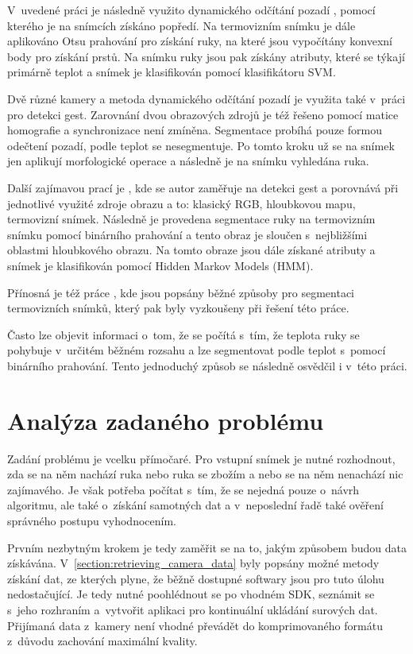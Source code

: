     V~uvedené práci je následně využito dynamického odčítání pozadí \cite{opencvMOG}, pomocí kterého je na snímcích získáno popředí. Na termovizním snímku je dále aplikováno Otsu prahování \cite{otsu1975threshold} pro získání ruky, na které jsou vypočítány konvexní body pro získání prstů. Na snímku ruky jsou pak získány atributy, které se týkají primárně teplot a snímek je klasifikován pomocí klasifikátoru SVM. 
    
    Dvě různé kamery a metoda dynamického odčítání pozadí je využita také v~práci \cite{zeng2012hand} pro detekci gest. Zarovnání dvou obrazových zdrojů je též řešeno pomocí matice homografie a synchronizace není zmíněna. Segmentace probíhá pouze formou odečtení pozadí, podle teplot se nesegmentuje. Po tomto kroku už se na snímek jen aplikují morfologické operace a následně je na snímku vyhledána ruka.
    
		Další zajímavou prací je \cite{appenrodt2010data}, kde se autor zaměřuje na detekci gest a porovnává při jednotlivé využité zdroje obrazu a to: klasický RGB, hloubkovou mapu, termovizní snímek. Následně je provedena segmentace ruky na termovizním snímku pomocí binárního prahování a tento obraz je sloučen s~nejbližšími oblastmi hloubkového obrazu. Na tomto obraze jsou dále získané atributy a snímek je klasifikován pomocí Hidden Markov Models (HMM).

Přínosná je též práce \cite{duarte2014segmentation}, kde jsou popsány běžné způsoby pro segmentaci termovizních snímků, který pak byly vyzkoušeny při řešení této práce.


Často lze objevit \cite{sato2000fast} informaci o~tom, že se počítá s~tím, že teplota ruky se pohybuje v~určitém běžném rozsahu a lze segmentovat podle teplot s~pomocí binárního prahování. Tento jednoduchý způsob se následně osvědčil i v~této práci.

\section{Analýza zadaného problému}
Zadání problému je vcelku přímočaré. Pro vstupní snímek je nutné rozhodnout, zda se na něm nachází ruka nebo ruka se zbožím a nebo se na něm nenachází nic zajímavého. Je však potřeba počítat s~tím, že se nejedná pouze o~návrh algoritmu, ale také o~získání samotných dat a v~neposlední řadě také ověření správného postupu vyhodnocením. 

Prvním nezbytným krokem je tedy zaměřit se na to, jakým způsobem budou data získávána. V~\ref{section:retrieving_camera_data} byly popsány možné metody získání dat, ze kterých plyne, že běžně dostupné softwary jsou pro tuto úlohu nedostačující. Je tedy nutné poohlédnout se po vhodném SDK, seznámit se s~jeho rozhraním a~vytvořit aplikaci pro kontinuální ukládání surových dat. Přijímaná data z~kamery není vhodné převádět do komprimovaného formátu z~důvodu zachování maximální kvality.


